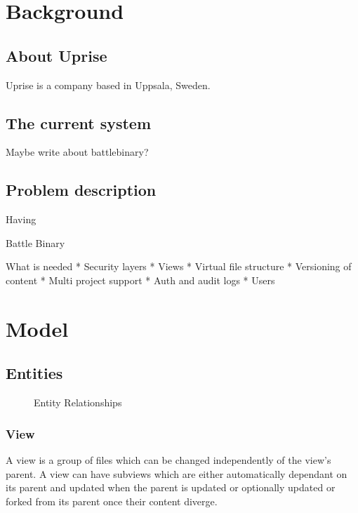 \documentclass[a4paper,12pt]{article}
\begin{document}
\section{Background}
\subsection{About Uprise}
Uprise is a company based in Uppsala, Sweden. 

\subsection{The current system}
Maybe write about battlebinary?  

\subsection{Problem description}
Having
  
Battle Binary

What is needed
* Security layers
* Views
* Virtual file structure
* Versioning of content
* Multi project support
* Auth and audit logs
* Users

\section{Model}
\subsection{Entities}
\begin{figure}[htp] 
    \caption{Entity Relationships}
    \label{fig:relation}
\end{figure}

\subsubsection{View}
A view is a group of files which can be changed independently of the view's parent.
A view can have subviews which are either automatically dependant on its parent and 
updated when the parent is updated or optionally updated or forked from its parent 
once their content diverge.
\end{document}
